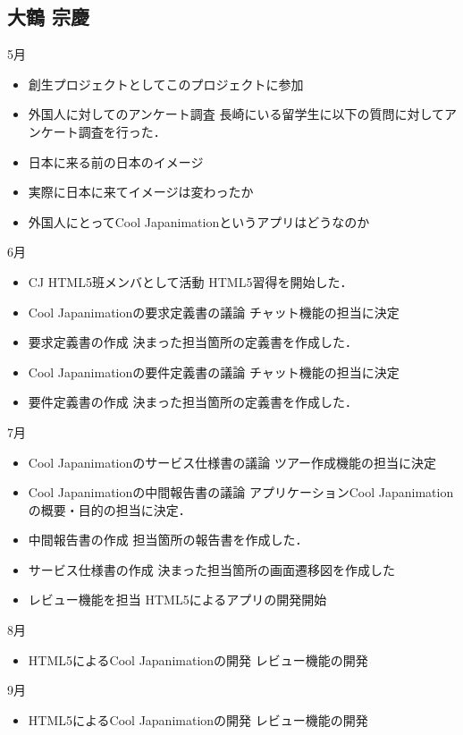 \subsection{大鶴 宗慶}
5月
\begin{itemize}
\item 創生プロジェクトとしてこのプロジェクトに参加
\item 外国人に対してのアンケート調査
	長崎にいる留学生に以下の質問に対してアンケート調査を行った．
	\item 日本に来る前の日本のイメージ
	\item 実際に日本に来てイメージは変わったか
	\item 外国人にとってCool Japanimationというアプリはどうなのか
\end{itemize}
\par
6月
\begin{itemize}
\item CJ HTML5班メンバとして活動
	HTML5習得を開始した．
\item Cool Japanimationの要求定義書の議論
	チャット機能の担当に決定
\item 要求定義書の作成
	決まった担当箇所の定義書を作成した．
\item Cool Japanimationの要件定義書の議論
	チャット機能の担当に決定
\item 要件定義書の作成
	決まった担当箇所の定義書を作成した．
\end{itemize}
\par
7月
\begin{itemize}
\item Cool Japanimationのサービス仕様書の議論
	ツアー作成機能の担当に決定
\item Cool Japanimationの中間報告書の議論
	アプリケーションCool Japanimationの概要・目的の担当に決定．
\item 中間報告書の作成
	担当箇所の報告書を作成した．
\item サービス仕様書の作成
	決まった担当箇所の画面遷移図を作成した
\item レビュー機能を担当
	HTML5によるアプリの開発開始
\end{itemize}
\par
8月
\begin{itemize}
\item HTML5によるCool Japanimationの開発
	レビュー機能の開発
\end{itemize}
\par
9月
\begin{itemize}
\item HTML5によるCool Japanimationの開発
	レビュー機能の開発
\end{itemize}
